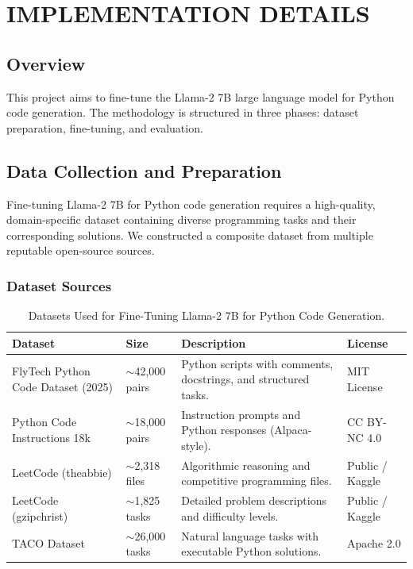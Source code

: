 \chapter{IMPLEMENTATION DETAILS}

\section{Overview}
This project aims to fine-tune the Llama-2 7B large language model for Python code generation. 
The methodology is structured in three phases: dataset preparation, fine-tuning, and evaluation. 

\section{Data Collection and Preparation}
Fine-tuning Llama-2 7B for Python code generation requires a high-quality, domain-specific dataset 
containing diverse programming tasks and their corresponding solutions. 
We constructed a composite dataset from multiple reputable open-source sources.

\subsection{Dataset Sources}
\begin{table}[h!]
\centering
\caption{Datasets Used for Fine-Tuning Llama-2 7B for Python Code Generation.}
\begin{tabular}{|p{3.5cm}|p{2cm}|p{5cm}|p{2.5cm}|}
\hline
\textbf{Dataset} & \textbf{Size} & \textbf{Description} & \textbf{License} \\
\hline
FlyTech Python Code Dataset (2025) & $\sim$42,000 pairs & Python scripts with comments, docstrings, and structured tasks. & MIT License \\
\hline
Python Code Instructions 18k & $\sim$18,000 pairs & Instruction prompts and Python responses (Alpaca-style). & CC BY-NC 4.0 \\
\hline
LeetCode (theabbie) & $\sim$2,318 files & Algorithmic reasoning and competitive programming files. & Public / Kaggle \\
\hline
LeetCode (gzipchrist) & $\sim$1,825 tasks & Detailed problem descriptions and difficulty levels. & Public / Kaggle \\
\hline
TACO Dataset & $\sim$26,000 tasks & Natural language tasks with executable Python solutions. & Apache 2.0 \\
\hline
\end{tabular}
\end{table}

